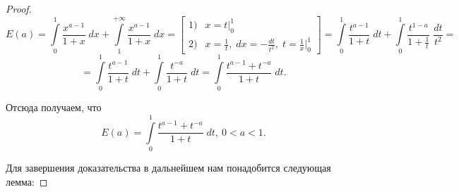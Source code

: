 \documentclass[../../main.tex]{subfiles}
\begin{document}
	\begin{proof}
		\[  E(a) =  \int\limits_{0}^{1}  \frac{x^{a-1}}{1+x} \; dx + 
		\int\limits_{1}^{+\infty} \frac{x^{a-1}}{1+x} \; dx  = \left[  
		\begin{array}{ll}
    1)& x = t \big|_{0}^{1} \\
		2)& \displaystyle x = \frac{1}{t}, \; dx = - \frac{dt}{t^2}, \; t = 
		\frac{1}{x} 
		\bigg|_{0}^{1}
		\end{array}  \right] = \int\limits_{0}^{1} \frac{t^{a-1}}{1+t} \; dt + 
		\int\limits_{0}^{1} \frac{t^{1-a}}{1+\frac{1}{t}} \; \frac{dt}{t^2} =      \]
		\[  = \int\limits_{0}^{1} \frac{t^{a-1}}{1+t} \; dt +  \int\limits_{0}^{1} 
		\frac{t^{-a}}{1+t} \; dt = \int\limits_{0}^{1}  \frac{t^{a-1} + t^{-a}}{1+t} 
		\; dt.\]
		
		Отсюда получаем, что
		\begin{equation}
		\label{14:17}
		  E(a) = \int\limits_{0}^{1}  \frac{t^{a-1} + t^{-a}}{1+t} \; dt,\ 0<a<1.
		\end{equation}
		
		Для завершения доказательства в дальнейшем нам понадобится следующая лемма:
		

\end{proof}
\end{document}
